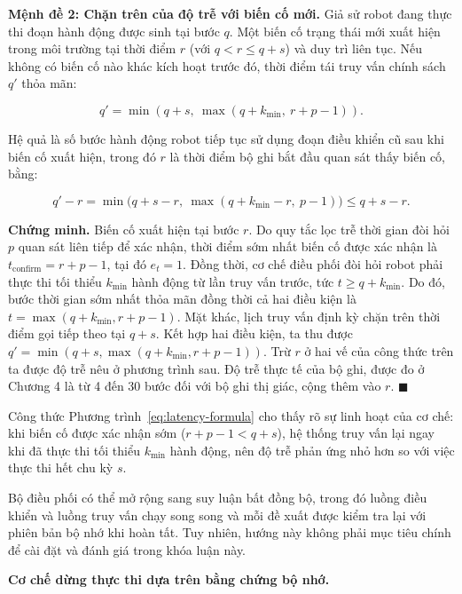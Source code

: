 \textbf{Mệnh đề 2: Chặn trên của độ trễ với biến cố mới.} Giả sử robot đang thực thi đoạn hành động được sinh tại bước $q$. Một biến cố trạng thái mới xuất hiện trong môi trường tại thời điểm $r$ (với $q < r \le q + s$) và duy trì liên tục. Nếu không có biến cố nào khác kích hoạt trước đó, thời điểm tái truy vấn chính sách $q'$ thỏa mãn:

\begin{equation}
q' = \min(q + s,\ \max(q + k_{\min},\ r + p - 1)).
\label{eq:latency-formula}
\end{equation}

Hệ quả là số bước hành động robot tiếp tục sử dụng đoạn điều khiển cũ sau khi biến cố xuất hiện, trong đó $r$ là thời điểm bộ ghi bắt đầu quan sát thấy biến cố, bằng:

\begin{equation}
q' - r = \min\!\big(q + s - r,\ \max(q + k_{\min} - r,\ p - 1)\big) \le q + s - r.
\label{eq:latency-bound}
\end{equation}

\textbf{Chứng minh.} Biến cố xuất hiện tại bước $r$. Do quy tắc lọc trễ thời gian đòi hỏi $p$ quan sát liên tiếp để xác nhận, thời điểm sớm nhất biến cố được xác nhận là $t_{\mathrm{confirm}} = r + p - 1$, tại đó $e_t = 1$. Đồng thời, cơ chế điều phối đòi hỏi robot phải thực thi tối thiểu $k_{\min}$ hành động từ lần truy vấn trước, tức $t \ge q + k_{\min}$. Do đó, bước thời gian sớm nhất thỏa mãn đồng thời cả hai điều kiện là $t = \max(q + k_{\min}, r + p - 1)$. Mặt khác, lịch truy vấn định kỳ chặn trên thời điểm gọi tiếp theo tại $q + s$. Kết hợp hai điều kiện, ta thu được $q' = \min(q + s, \max(q + k_{\min}, r + p - 1))$. Trừ $r$ ở hai vế của công thức trên ta được độ trễ nêu ở phương trình sau. Độ trễ thực tế của bộ ghi, được đo ở Chương 4 là từ 4 đến 30 bước đối với bộ ghi thị giác, cộng thêm vào $r$. $\blacksquare$

Công thức Phương trình~\eqref{eq:latency-formula} cho thấy rõ sự linh hoạt của cơ chế: khi biến cố được xác nhận sớm ($r + p - 1 < q + s$), hệ thống truy vấn lại ngay khi đã thực thi tối thiểu $k_{\min}$ hành động, nên độ trễ phản ứng nhỏ hơn so với việc thực thi hết chu kỳ $s$.

Bộ điều phối có thể mở rộng sang suy luận bất đồng bộ, trong đó luồng điều khiển và luồng truy vấn chạy song song và mỗi đề xuất được kiểm tra lại với phiên bản bộ nhớ khi hoàn tất. Tuy nhiên, hướng này không phải mục tiêu chính để cài đặt và đánh giá trong khóa luận này.

\textbf{Cơ chế dừng thực thi dựa trên bằng chứng bộ nhớ.}
\label{sec:method-memory-halt}

